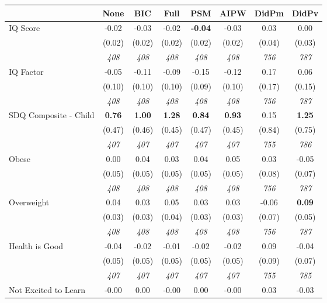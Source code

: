 \begin{tabular}{l c c c c c c c}
\toprule
 & None & BIC & Full & PSM & AIPW & DidPm & DidPv \\
\midrule
IQ Score & -0.02 & -0.03 & -0.02 & \textbf{-0.04} & -0.03 & 0.03 & 0.00 \\
& (0.02) & (0.02) & (0.02) & (0.02) & (0.02) & (0.04) & (0.03) \\
& \textit{ 408 } & \textit{ 408 } & \textit{ 408 } & \textit{ 408 } & \textit{ 408 } & \textit{ 756 } & \textit{ 787 } \\
IQ Factor & -0.05 & -0.11 & -0.09 & -0.15 & -0.12 & 0.17 & 0.06 \\
& (0.10) & (0.10) & (0.10) & (0.09) & (0.10) & (0.17) & (0.15) \\
& \textit{ 408 } & \textit{ 408 } & \textit{ 408 } & \textit{ 408 } & \textit{ 408 } & \textit{ 756 } & \textit{ 787 } \\
SDQ Composite - Child & \textbf{ 0.76 } & \textbf{ 1.00 } & \textbf{ 1.28 } & \textbf{0.84} & \textbf{0.93} & 0.15 & \textbf{ 1.25 } \\
& (0.47) & (0.46) & (0.45) & (0.47) & (0.45) & (0.84) & (0.75) \\
& \textit{ 407 } & \textit{ 407 } & \textit{ 407 } & \textit{ 407 } & \textit{ 407 } & \textit{ 755 } & \textit{ 786 } \\
Obese & 0.00 & 0.04 & 0.03 & 0.04 & 0.05 & 0.03 & -0.05 \\
& (0.05) & (0.05) & (0.05) & (0.05) & (0.05) & (0.08) & (0.07) \\
& \textit{ 408 } & \textit{ 408 } & \textit{ 408 } & \textit{ 408 } & \textit{ 408 } & \textit{ 756 } & \textit{ 787 } \\
Overweight & 0.04 & 0.03 & 0.05 & 0.03 & 0.03 & -0.06 & \textbf{ 0.09 } \\
& (0.03) & (0.03) & (0.04) & (0.03) & (0.03) & (0.07) & (0.05) \\
& \textit{ 408 } & \textit{ 408 } & \textit{ 408 } & \textit{ 408 } & \textit{ 408 } & \textit{ 756 } & \textit{ 787 } \\
Health is Good & -0.04 & -0.02 & -0.01 & -0.02 & -0.02 & 0.09 & -0.04 \\
& (0.05) & (0.05) & (0.05) & (0.05) & (0.05) & (0.09) & (0.07) \\
& \textit{ 407 } & \textit{ 407 } & \textit{ 407 } & \textit{ 407 } & \textit{ 407 } & \textit{ 755 } & \textit{ 785 } \\
Not Excited to Learn & -0.00 & 0.00 & -0.00 & 0.00 & -0.00 & 0.03 & -0.03 \\

\end{tabular}

